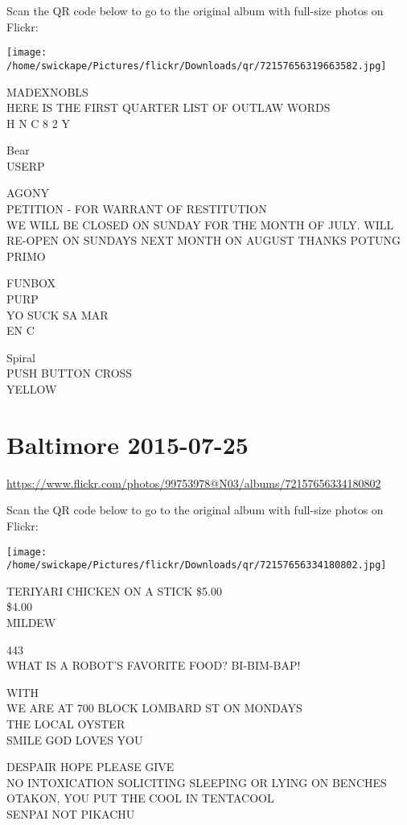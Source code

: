 \documentclass[10pt,letterpaper]{article}
\begin{document}
Scan the QR code below to go to the original album with full-size photos on Flickr:

\texttt{[image: /home/swickape/Pictures/flickr/Downloads/qr/72157656319663582.jpg]}
\pagebreak

MADEXNOBLS\\
HERE IS THE FIRST QUARTER LIST OF OUTLAW WORDS\\
H N C 8 2 Y

Bear\\
USERP

AGONY\\
PETITION {-} FOR WARRANT OF RESTITUTION\\
WE WILL BE CLOSED ON SUNDAY FOR THE MONTH OF JULY.  WILL RE{-}OPEN ON SUNDAYS NEXT MONTH ON AUGUST THANKS POTUNG\\
PRIMO

FUNBOX\\
PURP\\
YO SUCK SA MAR\\
EN C

Spiral\\
PUSH BUTTON CROSS\\
YELLOW
\pagebreak

\section*{Baltimore 2015-07-25}

\url{https://www.flickr.com/photos/99753978@N03/albums/72157656334180802}

Scan the QR code below to go to the original album with full-size photos on Flickr:

\texttt{[image: /home/swickape/Pictures/flickr/Downloads/qr/72157656334180802.jpg]}
\pagebreak

TERIYARI CHICKEN ON A STICK \$5.00\\
\$4.00\\
MILDEW

443\\
WHAT IS A ROBOT'S FAVORITE FOOD?  BI{-}BIM{-}BAP!

WITH\\
WE ARE AT 700 BLOCK LOMBARD ST ON MONDAYS\\
THE LOCAL OYSTER\\
SMILE GOD LOVES YOU

DESPAIR HOPE PLEASE GIVE\\
NO INTOXICATION SOLICITING SLEEPING OR LYING ON BENCHES\\
OTAKON, YOU PUT THE COOL IN TENTACOOL\\
SENPAI NOT PIKACHU
\pagebreak
\end{document}

